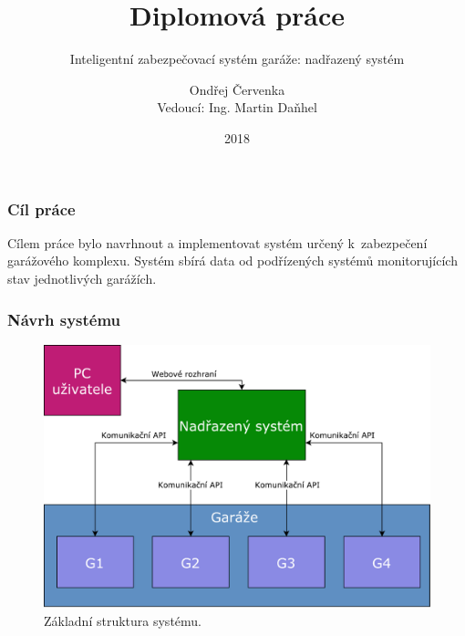\documentclass{beamer}
\title
{Diplomová práce}
\subtitle{Inteligentní zabezpečovací systém garáže: nadřazený systém }
\author
{Ondřej Červenka \\ Vedoucí: Ing. Martin Daňhel}
\institute
{
  České vysoké učení technické v Praze\\
  Fakulta informačních technologií
}
\date{2018}
\begin{document}
  \frame{\titlepage}
  \begin{frame}
    \frametitle{Cíl práce}

    Cílem práce bylo navrhnout a implementovat systém určený k~zabezpečení garážového komplexu. Systém sbírá data od podřízených systémů monitorujících stav jednotlivých garážích.



  \end{frame}

  \begin{frame}
    \frametitle{Návrh systému}

    \begin{figure}
        \includegraphics[scale=0.3]{../images/basic_struct.pdf}
        \caption{Základní struktura systému.}
      \end{figure}

  \end{frame}
\end{document}
